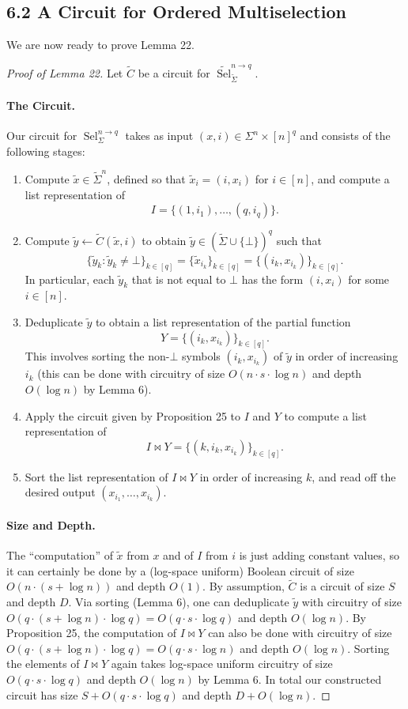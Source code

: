 \documentclass[10pt,a4paper]{article}
\newcommand{\Sel}{\operatorname{Sel}}
\newcommand{\uSel}{\widetilde{\operatorname{Sel}}}
\begin{document}
\subsection*{6.2 A Circuit for Ordered Multiselection}
We are now ready to prove Lemma 22.
\begin{proof}[Proof of Lemma 22]
Let $\widetilde C$ be a circuit for $\uSel_{\widetilde\Sigma}^{n\to q}$.
\paragraph{The Circuit.} Our circuit for $\Sel_\Sigma^{n\to q}$ takes as input $(x,i)\in\Sigma^n\times[n]^q$ and consists of the following stages:
\begin{enumerate}
\item Compute $\widetilde x\in\widetilde\Sigma^n$, defined so that $\widetilde x_i=(i,x_i)$ for $i\in[n]$, and compute a list representation of
\[I=\{(1,i_1),\ldots,(q,i_q)\}.\]
\item Compute $\widetilde y\leftarrow\widetilde C(\widetilde x,i)$ to obtain $\widetilde y\in(\widetilde\Sigma\cup\{\bot\})^q$ such that
\[\{\widetilde y_k:\widetilde y_k\ne\bot\}_{k\in[q]}=\{\widetilde x_{i_k}\}_{k\in[q]}=\{(i_k,x_{i_k})\}_{k\in[q]}.\]
In particular, each $\widetilde y_k$ that is not equal to $\bot$ has the form $(i,x_i)$ for some $i\in[n]$.
\item Deduplicate $\widetilde y$ to obtain a list representation of the partial function
\[Y=\{(i_k,x_{i_k})\}_{k\in[q]}.\]
This involves sorting the non-$\bot$ symbols $(i_k,x_{i_k})$ of $\widetilde y$ in order of increasing $i_k$ (this can be done with circuitry of size $O(n\cdot s\cdot\log n)$ and depth $O(\log n)$ by Lemma 6).
\item Apply the circuit given by Proposition 25 to $I$ and $Y$ to compute a list representation of
\[I\bowtie Y=\{(k,i_k,x_{i_k})\}_{k\in[q]}.\]
\item Sort the list representation of $I\bowtie Y$ in order of increasing $k$, and read off the desired output $(x_{i_1},\ldots,x_{i_k})$.
\end{enumerate}
\paragraph{Size and Depth.} The ``computation'' of $\widetilde x$ from $x$ and of $I$ from $i$ is just adding constant values, so it can certainly be done by a (log-space uniform) Boolean circuit of size $O(n\cdot(s+\log n))$ and depth $O(1)$.
By assumption, $\widetilde C$ is a circuit of size $S$ and depth $D$.
Via sorting (Lemma 6), one can deduplicate $\widetilde y$ with circuitry of size $O(q\cdot(s+\log n)\cdot\log q)=O(q\cdot s\cdot\log q)$ and depth $O(\log n)$.
By Proposition 25, the computation of $I\bowtie Y$ can also be done with circuitry of size $O(q\cdot(s+\log n)\cdot\log q)=O(q\cdot s\cdot\log n)$ and depth $O(\log n)$.
Sorting the elements of $I\bowtie Y$ again takes log-space uniform circuitry of size $O(q\cdot s\cdot\log q)$ and depth $O(\log n)$ by Lemma 6.
In total our constructed circuit has size $S+O(q\cdot s\cdot\log q)$ and depth $D+O(\log n)$.
\end{proof}
\end{document}
